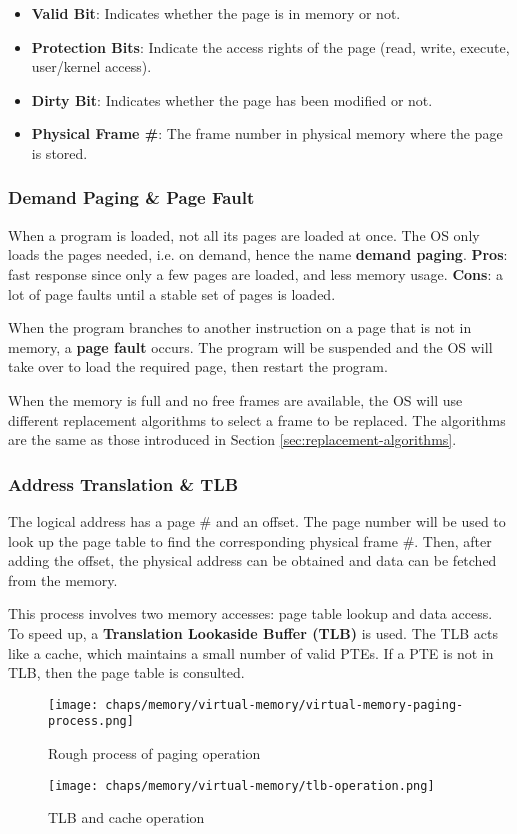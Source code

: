 \begin{itemize}
    \item \textbf{Valid Bit}: Indicates whether the page is in memory or not.
    \item \textbf{Protection Bits}: Indicate the access rights of the page (read, write, execute, user/kernel access).
    \item \textbf{Dirty Bit}: Indicates whether the page has been modified or not.
    \item \textbf{Physical Frame \#}: The frame number in physical memory where the page is stored.
\end{itemize}

\subsubsection{Demand Paging \& Page Fault}

When a program is loaded, not all its pages are loaded at once. The OS only loads
the pages needed, i.e. on demand, hence the name \textbf{demand paging}.
\textbf{Pros}: fast response since only a few pages are loaded, and less memory usage.
\textbf{Cons}: a lot of page faults until a stable set of pages is loaded.

When the program branches to another instruction on a page that is not in memory,
a \textbf{page fault} occurs. The program will be suspended and the OS will take over
to load the required page, then restart the program.

When the memory is full and no free frames are available, the OS will use different
replacement algorithms to select a frame to be replaced. The algorithms are the same
as those introduced in Section \ref{sec:replacement-algorithms}.

\subsubsection{Address Translation \& TLB}

The logical address has a page \# and an offset. The page number will be used to
look up the page table to find the corresponding physical frame \#. Then, after adding
the offset, the physical address can be obtained and data can be fetched from the memory.

This process involves two memory accesses: page table lookup and data access.
To speed up, a \textbf{Translation Lookaside Buffer (TLB)} is used.
The TLB acts like a cache, which maintains a small number of valid PTEs.
If a PTE is not in TLB, then the page table is consulted.

\begin{figure}[H]
    \centering
    \texttt{[image: chaps/memory/virtual-memory/virtual-memory-paging-process.png]}
    \caption{Rough process of paging operation}
\end{figure}

\begin{figure}[H]
    \centering
    \texttt{[image: chaps/memory/virtual-memory/tlb-operation.png]}
    \caption{TLB and cache operation}
\end{figure}
